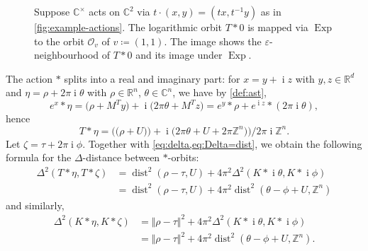 \documentclass[a4paper,USenglish,cleveref,numberwithinsect]{lipics-v2021}
\DeclareMathOperator{\ii}{i}
\DeclareMathOperator{\Exp}{Exp}
\DeclareMathOperator{\dist}{dist}
\newcommand{\CC}{\mathbb{C}}
\newcommand{\ZZ}{\mathbb{Z}}
\newcommand{\RR}{\mathbb{R}}
\newcommand{\OO}{\ensuremath{\mathcal{O}}}
\numberwithin{equation}{section}
\begin{document}
\begin{figure}
\caption{Suppose $\CC^\times$ acts on $\CC^2$ via $t\cdot (x,y)=(tx,t^{-1}y)$ as in \cref{fig:example-actions}.
The logarithmic orbit $T\ast 0$ is mapped via $\Exp$ to the orbit $\OO_v$ of $v\coloneqq (1,1)$.
The image shows the $\varepsilon$-neighbourhood of $T\ast 0$ and its image under $\Exp$.
\label{fig:kempf ness example}
}
\end{figure}

The action $*$ splits into a real and imaginary part:
for $x=y+\ii z$ with $y,z\in\RR^d$ and $\eta = \rho+2\pi\ii\theta$
with $\rho\in\RR^n$, $\theta\in\CC^n$, we have by \cref{def:ast},
\begin{equation}\label{eq:indep}
	e^x \ast \eta
  = \big(\rho + M^T y\big) + \ii\big( 2\pi\theta + M^T z\big)
  = e^y \ast \rho +e^{\ii z}\ast (2\pi\ii\theta) ,
\end{equation}
hence
\begin{equation*}
		T\ast\eta
		= \Big( \big(\rho+ U)\big) + \ii \big(2\pi\theta+ U +2\pi\ZZ^n\big)\Big)\big/2\pi\ii\ZZ^n .
\end{equation*}
Let $\zeta=\tau+2\pi\ii\phi$.
Together with \cref{eq:delta,eq:Delta=dist}, we obtain the following formula for the $\Delta$-distance between $\ast$-orbits:
\begin{equation}\label{prop:delta-orbit-distance}
\begin{aligned}
\Delta^2(T\ast\eta,T\ast\zeta)
 &= \dist^2(\rho-\tau, U) + 4\pi^2 \Delta^2(K\ast \ii\theta, K\ast \ii\phi) \\
 &= \dist^2(\rho-\tau, U) + 4\pi^2 \dist^2(\theta-\phi + U, \ZZ^n)
\end{aligned}
\end{equation}
and similarly,
\begin{equation}\label{prop:Kdelta-orbit-distance}
\begin{aligned}
 \Delta^2(K\ast\eta, K\ast\zeta)
 &= \Vert \rho-\tau \Vert^2 + 4\pi^2 \Delta^2(K\ast \ii\theta, K\ast \ii\phi) \\
 &= \Vert \rho-\tau \Vert^2 + 4\pi^2 \dist^2(\theta-\phi + U, \ZZ^n) .
\end{aligned}
\end{equation}
\end{document}
